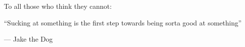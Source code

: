 To all those who think they cannot: 

``Sucking at something is the first step towards being sorta good at something''

--- Jake the Dog